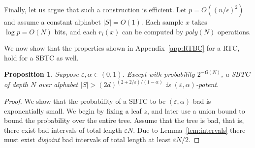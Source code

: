 \documentclass[ letterpaper, 11pt]{article}
\newtheorem{proposition}[theorem]{Proposition}
\newcommand{\eps}{\varepsilon}
\newcommand{\potent}{potent\xspace}
\newcommand{\RTBC}{\textsf{RTC}\xspace}
\newcommand{\KTC}{\textsf{SBTC}\xspace}
\begin{document}
Finally, let us argue that such a construction is efficient.
Let $p=O((n/\epsilon)^2)$ and assume a constant alphabet $|S|=O(1)$.
Each sample $x$ takes $\log p=O(N)$ bits, and each $r_i(x)$ can be computed by $poly(N)$ operations.




\bigskip
We now show that the properties shown in Appendix~\ref{app:RTBC} for a \RTBC,
hold for a \KTC as well.
\begin{proposition}\label{prop:KTCisPotent}
Suppose $\eps,\alpha \in (0,1)$.
Except with probability $2^{-\Omega(N)}$,
a \KTC of depth $N$ over alphabet $|S|>(2d)^{(2+2/\eps)/(1-\alpha)}$
is $(\varepsilon,\alpha)$-\potent.
\end{proposition}
\begin{proof}
We show that the probability of a \KTC to be
$(\varepsilon,\alpha)$-bad is exponentially small.
We begin by fixing a leaf $z$, and later use a union bound
to bound the probability over the entire tree.
Assume that the tree is bad, that is,
there exist bad intervals of total length $\varepsilon N$.
Due to Lemma~\ref{lem:intervals}
there must exist \emph{disjoint}
bad intervals of total length at least $\varepsilon N/2$.



\end{proof}
\end{document}
